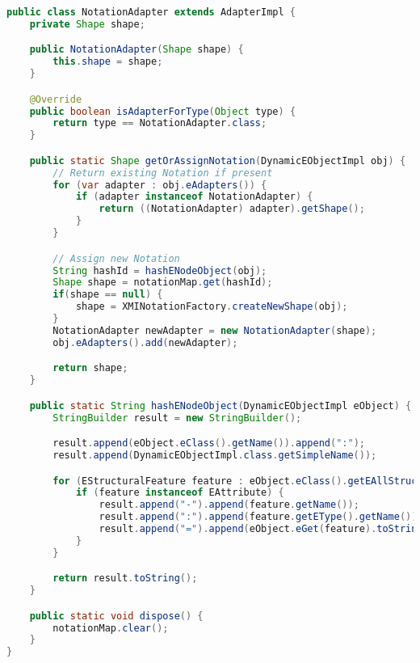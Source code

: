 \begin{lstlisting}[language=Java, caption={Parts of \code{NotationAdapter}}, label={lst:notation-adapter}]
public class NotationAdapter extends AdapterImpl {
    private Shape shape;

    public NotationAdapter(Shape shape) {
        this.shape = shape;
    }

    @Override
    public boolean isAdapterForType(Object type) {
        return type == NotationAdapter.class;
    }

    public static Shape getOrAssignNotation(DynamicEObjectImpl obj) {
        // Return existing Notation if present
        for (var adapter : obj.eAdapters()) {
            if (adapter instanceof NotationAdapter) {
                return ((NotationAdapter) adapter).getShape();
            }
        }

        // Assign new Notation
        String hashId = hashENodeObject(obj);
        Shape shape = notationMap.get(hashId);
        if(shape == null) {
            shape = XMINotationFactory.createNewShape(obj);
        }
        NotationAdapter newAdapter = new NotationAdapter(shape);
        obj.eAdapters().add(newAdapter);

        return shape;
    }

    public static String hashENodeObject(DynamicEObjectImpl eObject) {
        StringBuilder result = new StringBuilder();

        result.append(eObject.eClass().getName()).append(":");
        result.append(DynamicEObjectImpl.class.getSimpleName());

        for (EStructuralFeature feature : eObject.eClass().getEAllStructuralFeatures()) {
            if (feature instanceof EAttribute) {
                result.append("-").append(feature.getName());
                result.append(":").append(feature.getEType().getName());
                result.append("=").append(eObject.eGet(feature).toString());
            }
        }

        return result.toString();
    }

    public static void dispose() {
        notationMap.clear();
    }
}
\end{lstlisting}